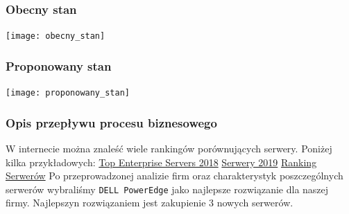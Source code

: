 \documentclass[a4paper, 12pt]{article}
\begin{document}
				\subsubsection{Obecny stan}
			  \texttt{[image: obecny\_stan]}
			  
			  	\subsubsection{Proponowany stan}
			  	\texttt{[image: proponowany\_stan]} \newline
			  	\subsubsection{Opis przepływu procesu biznesowego}
			  	\hspace*{1cm} W internecie można znaleść wiele rankingów porównujących serwery. Poniżej kilka przykładowych: \newline
				\href{https://www.crn.com/slide-shows/data-center/300106536/the-10-top-enterprise-servers-of-2018-so-far.htm/1} {Top Enterprise Servers 2018} \newline
				\href{https://www.techradar.com/news/best-small-business-servers} {Serwery 2019}\newline
				\href{https://www.skapiec.pl/cat/93-serwery/ranking.html} {Ranking Serwerów}\newline
				\hspace*{1cm}Po przeprowadzonej analizie firm oraz charakterystyk poszczególnych serwerów wybraliśmy \texttt{DELL PowerEdge} jako najlepsze rozwiązanie dla naszej firmy. Najlepszyn rozwiązaniem jest zakupienie 3 nowych serwerów.
				
\end{document}

